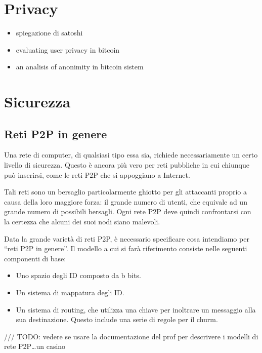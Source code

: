 \chapter{Privacy}\label{privacy}

\begin{itemize}
\itemsep1pt\parskip0pt
\item
  spiegazione di satoshi
\item
  evaluating user privacy in bitcoin
\item
  an analisis of anonimity in bitcoin sistem
\end{itemize}

\chapter{Sicurezza}\label{sicurezza}

\section{Reti P2P in genere}\label{reti-p2p-in-genere}

Una rete di computer, di qualsiasi tipo essa sia, richiede
necessariamente un certo livello di sicurezza. Questo è ancora più vero
per reti pubbliche in cui chiunque può inserirsi, come le reti P2P che
si appoggiano a Internet.

Tali reti sono un bersaglio particolarmente ghiotto per gli attaccanti
proprio a causa della loro maggiore forza: il grande numero di utenti,
che equivale ad un grande numero di possibili bersagli. Ogni rete P2P
deve quindi confrontarsi con la certezza che alcuni dei suoi nodi siano
malevoli.

Data la grande varietà di reti P2P, è necessario specificare cosa
intendiamo per ``reti P2P in genere''. Il modello \cite{vulenrabilities}
a cui si farà riferimento consiste nelle seguenti componenti di base:

\begin{itemize}
\itemsep1pt\parskip0pt
\item
  Uno spazio degli ID composto da b bits.
\item
  Un sistema di mappatura degli ID.
\item
  Un sistema di routing, che utilizza una chiave per inoltrare un
  messaggio alla sua destinazione. Questo include una serie di regole
  per il churm.
\end{itemize}

/// TODO: vedere se usare la documentazione del prof per descrivere i
modelli di rete P2P\ldots{}un casino

